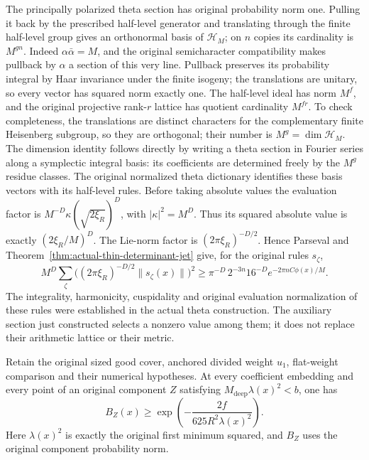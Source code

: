 The principally polarized theta section has original probability
norm one.  Pulling it back by the prescribed half-level generator
and translating through the finite half-level group gives an
orthonormal basis of $\mathcal H_M$; on $n$ copies its cardinality
is $M^{gn}$.  Indeed $\alpha\bar\alpha=M$, and the original
semicharacter compatibility makes pullback by $\alpha$ a section
of this very line.  Pullback preserves its probability integral
by Haar invariance under the finite isogeny; the translations are
unitary, so every vector has squared norm exactly one.
The half-level ideal has norm $M^f$, and the original projective
rank-$r$ lattice has quotient cardinality $M^{fr}$.
To check completeness, the translations are distinct
characters for the complementary finite Heisenberg subgroup, so
they are orthogonal; their number is $M^g=\dim\mathcal H_M$.
The dimension identity follows directly by writing a theta section
in Fourier series along a symplectic integral basis: its
coefficients are determined freely by the $M^g$ residue classes.
The original normalized theta dictionary identifies these basis
vectors with its half-level rules.  Before taking absolute values
the evaluation factor is
$M^{-D}\kappa(\sqrt{2\xi_R})^D$, with
$|\kappa|^2=M^D$.  Thus its squared absolute value is exactly
$(2\xi_R/M)^D$.  The Lie-norm factor is
$(2\pi\xi_R)^{-D/2}$.  Hence Parseval and
Theorem~\ref{thm:actual-thin-determinant-jet} give, for the original
rules $s_\zeta$,
\begin{equation}\label{eq:thin-actual-theta-sum}
 M^D\sum_{\zeta}
       \bigl((2\pi\xi_R)^{-D/2}\|s_\zeta(x)\|\bigr)^2
             \ge\pi^{-D}\,2^{-3n}16^{-D}
                           e^{-2\pi nC\phi(x)/M}.
\end{equation}
The integrality, harmonicity, cuspidality and original evaluation
normalization of these rules were established in the actual theta
construction.  The auxiliary section just constructed selects a
nonzero value among them; it does not replace their arithmetic
lattice or their metric.

\begin{theorem}
\label{thm:actual-thin-bergman}
Retain the original sized good cover, anchored divided weight
$u_1$, flat-weight comparison and their numerical hypotheses.
At every coefficient embedding and every point of an original
component $Z$ satisfying
$M_{\mathrm{deep}}\lambda(x)^2<b$, one has
\begin{equation}\label{eq:actual-thin-bergman}
                  B_Z(x)\ge
                  \exp\left(-\frac{2f}{625R^2\lambda(x)^2}\right).
\end{equation}
Here $\lambda(x)^2$ is exactly the original first minimum
squared, and $B_Z$ uses the original component probability norm.
\end{theorem}

